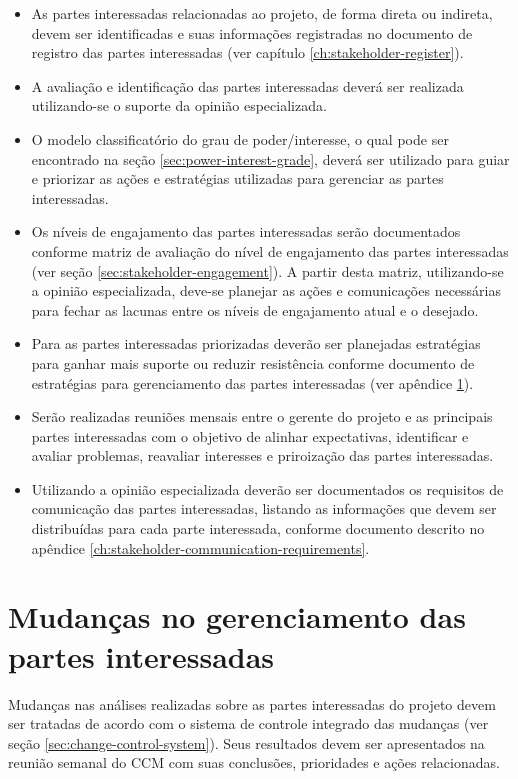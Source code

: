 \begin{itemize}
	\item As partes interessadas relacionadas ao projeto, de forma direta ou indireta, devem ser identificadas e suas informações registradas no documento de registro das partes interessadas (ver capítulo \ref{ch:stakeholder-register}).
	\item A avaliação e identificação das partes interessadas deverá ser realizada utilizando-se o suporte da opinião especializada.
    \item O modelo classificatório do grau de poder/interesse, o qual pode ser encontrado na seção \ref{sec:power-interest-grade}, deverá ser utilizado para guiar e priorizar as ações e estratégias utilizadas para gerenciar as partes interessadas. 
	\item Os níveis de engajamento das partes interessadas serão documentados conforme matriz de avaliação do nível de engajamento das partes interessadas (ver seção \ref{sec:stakeholder-engagement}). A partir desta matriz, utilizando-se a opinião especializada, deve-se planejar as ações e comunicações necessárias para fechar as lacunas entre os níveis de engajamento atual e o desejado.
    \item Para as partes interessadas priorizadas deverão ser planejadas estratégias para ganhar mais suporte ou reduzir resistência conforme documento de estratégias para gerenciamento das partes interessadas (ver apêndice \ref{}).
    \item Serão realizadas reuniões mensais entre o gerente do projeto e as principais partes interessadas com o objetivo de alinhar expectativas, identificar e avaliar problemas, reavaliar interesses e priroização das partes interessadas.
	\item Utilizando a opinião especializada deverão ser documentados os requisitos de comunicação das partes interessadas, listando as informações que devem ser distribuídas para cada parte interessada, conforme documento descrito no apêndice \ref{ch:stakeholder-communication-requirements}.
\end{itemize}

\section{Mudanças no gerenciamento das partes interessadas}

Mudanças nas análises realizadas sobre as partes interessadas do projeto devem ser tratadas de acordo com o sistema de controle integrado das mudanças (ver seção \ref{sec:change-control-system}). Seus resultados devem ser apresentados na reunião semanal do CCM com suas conclusões, prioridades e ações relacionadas.

